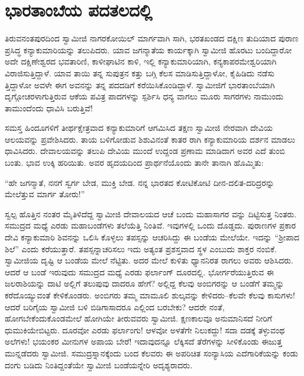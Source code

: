
\chapter{ಭಾರತಾಂಬೆಯ ಪದತಲದಲ್ಲಿ}

\noindent

ತಿರುವನಂತಪುರದಿಂದ ಸ್ವಾಮೀಜಿ ನಾಗರಕೋಯಿಲ್ ಮಾರ್ಗವಾಗಿ ಸಾಗಿ, ಭರತಖಂಡದ ದಕ್ಷಿಣ ತುದಿಯಾದ ಪುರಾಣ ಪ್ರಸಿದ್ಧ ಕನ್ಯಾಕುಮಾರಿಯನ್ನು ತಲುಪಿದರು. ಯಾವ ಜಗನ್ಮಾತೆಯ ಕಾರ್ಯಕ್ಕಾಗಿ ಸ್ವಾಮೀಜಿ ಹೊರಟು ಬಂದಿದ್ದಾರೋ ಅದೇ ದಕ್ಷಿಣೇಶ್ವರದ ಭವತಾರಿಣಿ, ಕಾಳೀಘಾಟಿನ ಕಾಳಿ, ಇಲ್ಲಿ ಕನ್ಯಾಕುಮಾರಿಯಾಗಿ, ಕನ್ಯಕಾಪರಮೇಶ್ವರಿಯಾಗಿ ವಿರಾಜಿಸುತ್ತಿದ್ದಾಳೆ. ಯಾವ ತಾಯಿ ತನ್ನ ಸುಪುತ್ರನ ಕತ್ತು ಬಗ್ಗಿ ಕೆಲಸ ಮಾಡಿಸುತ್ತಿದ್ದಾಳೋ, ಕೈಹಿಡಿದು ನಡೆಸು ತ್ತಿದ್ದಾಳೋ ಅವಳೇ ಈಗ ಅವನನ್ನು ತನ್ನ ಪದದಡಿಗೆ ಕರೆಯಿಸಿಕೊಂಡಿದ್ದಾಳೆ. ಸ್ವಾಮೀಜಿಗೆ ಭಾರತಾಂಬೆಯಾಗಿ ದೃಗ್ಗೋಚರಳಾಗುತ್ತಿರುವ ಆಕೆಯ ಪವಿತ್ರ ಪಾದಗಳನ್ನು ಸ್ಪರ್ಶಿಸಿ ಧನ್ಯ ವಾಗಲು ಮೂರು ಸಾಗರಗಳು ನಾಮುಂದು ತಾಮುಂದೆಂದು ಧಾವಿಸಿ ಬರುತ್ತಿವೆ!

ಸಮಸ್ತ ಹಿಂದೂಗಳಿಗೆ ತೀರ್ಥಕ್ಷೇತ್ರವಾದ ಕನ್ಯಾಕುಮಾರಿಗೆ ಆಗಮಿಸಿದ ತಕ್ಷಣ ಸ್ವಾಮೀಜಿ ನೇರವಾಗಿ ದೇವಿಯ ಆಲಯವನ್ನು ಪ್ರವೇಶಿಸಿದರು. ತಾಯ ಬಳಿಗೋಡುವ ಶಿಶುವಿನಂತೆ ಕಾತರ ರಾಗಿ ಕನ್ಯಾಕುಮಾರಿಯ ದರ್ಶನ ಮಾಡಲು ಧಾವಿಸಿದರು. ದೇವಾಲಯವನ್ನು ತಲುಪಿ ದೇವಿಯ ಮುಂದೆ ಉದ್ದಂಡ ಪ್ರಣಾಮ ಮಾಡಿದಾಗ ಅವರ ಎದೆ ತುಂಬಿ ಬಂತು. ಭಾವ ಉಕ್ಕಿ ಹರಿಯಿತು. ಅವರ ಹೃದಯದಿಂದ ಪ್ರಾರ್ಥನೆಯೊಂದು ತಾನೇ ತಾನಾಗಿ ಹೊಮ್ಮಿತು:

“ಹೇ ಜಗನ್ಮಾತೆ, ನನಗೆ ಸ್ವರ್ಗ ಬೇಡ, ಮುಕ್ತಿ ಬೇಡ. ನನ್ನ ಭಾರತದ ಕೋಟಿಕೋಟಿ ದೀನ-ದಲಿತ-ದರಿದ್ರರನ್ನು ಮೇಲೆತ್ತುವ ಮಾರ್ಗ ತೋರು!”

ಸ್ವಲ್ಪ ಹೊತ್ತಿನ ನಂತರ ಮೈತಿಳಿದೆದ್ದ ಸ್ವಾಮೀಜಿ ದೇವಾಲಯದ ಆಚೆ ಬಂದು ಮಹಾಸಾಗರ ವನ್ನು ದಿಟ್ಟಿಸುತ್ತ ನಿಂತರು. ಸಮುದ್ರದ ಮಧ್ಯೆ ಎರಡು ಮಹಾಬಂಡೆಗಳು ತಲೆಯೆತ್ತಿ ನಿಂತಿವೆ. ಇವುಗಳಲ್ಲಿ ಒಂದು ದೊಡ್ಡದು. ಪುರಾಣಗಳ ಪ್ರಕಾರ ದೇವಿ ಕನ್ಯಾಕುಮಾರಿ ಶಿವನನ್ನು ಒಲಿಸಿ ಕೊಳ್ಳಲು ತಪಸ್ಸನ್ನು ಆಚರಿಸಿದ್ದು ಈ ಬಂಡೆಯ ಮೇಲೆಯೇ. ಇದನ್ನು “ಶ್ರೀಪಾದ ಶಿಲೆ” ಎಂದು ಕರೆಯುತ್ತಾರೆ. ತಪಸ್ಸನ್ನಾಚರಿಸಲು ಇದು ಅತ್ಯಂತ ಪ್ರಶಸ್ತವಾದ ಸ್ಥಳ ಎಂಬುದು ಶಾಕ್ತರ ನಂಬಿಕೆ. ಸ್ವಾಮೀಜಿಯ ದೃಷ್ಟಿ ಆ ಬಂಡೆಯ ಮೇಲೆ ನೆಟ್ಟಿತು. ಅದರ ಮೇಲೆ ಕುಳಿತು ಧ್ಯಾನನಿರತ ರಾಗಲು ಅವರು ಆಶಿಸಿದರು. ಆದರೆ ಆ ಬಂಡೆ ಇರುವುದು ಸಮುದ್ರದ ಮಧ್ಯೆ ಎರಡು ಫರ್ಲಾಂಗ್ ದೂರದಲ್ಲಿ. ಭೋರ್ಗರೆಯುತ್ತಿರುವ ಈ ಜಲರಾಶಿಯನ್ನು ದಾಟಿ ಅಲ್ಲಿಗೆ ತಲುಪುವು ದಾದರೂ ಹೇಗೆ? ಅಲ್ಲಿದ್ದ ಕೆಲವು ಅಂಬಿಗರನ್ನು ಆ ಬಂಡೆಗೆ ತಮ್ಮನ್ನು ಕರೆದೊಯ್ಯುವಂತೆ ಕೇಳಿಕೊಂಡರು. ಅಂಬಿಗರು ತಮ್ಮ ಮಾಮೂಲಿ ಶುಲ್ಕವನ್ನು ಕೇಳಿದರು–ಕೆಲವೇ ಕೆಲವು ಕಾಸುಗಳು! ಆದರೆ ಬರಿಗೈಯ ಸ್ವಾಮೀಜಿ ಬಳಿ ಬಿಡಿಗಾಸಾದರೂ ಎಲ್ಲಿಂದ ಬರಬೇಕು? ಆದರೇ ನಂತೆ, ಹೋಗಬೇಕೆಂದುಕೊಂಡಮೇಲೆ ಹೋಗಿಯೇ ತೀರುವವರು ಸ್ವಾಮೀಜಿ. ಕ್ಷಣಕಾಲವೂ ಅನುಮಾನಿಸದೆ ನೀರಿಗೆ ಧುಮುಕಿಯೇಬಿಟ್ಟರು. ದೂರವೋ ಎರಡು ಫರ್ಲಾಂಗು! ಆಳವೋ ಅಳತೆಗೇ ನಿಲುಕದ್ದು! ಸದಾ ದಡಕ್ಕೆ ತಳ್ಳುವಂಥ ಅಲೆಗಳು! ಭಯಂಕರ ಮೀನುಗಳ ಅಪಾಯ ಬೇರೆ! ಇದಾವುದನ್ನೂ ಲೆಕ್ಕಿಸದೆ ತೆರೆಗಳನ್ನು ಸೀಳಿಕೊಂಡು ಈಜುತ್ತ ಮುನ್ನಡೆದರು ಸ್ವಾಮೀಜಿ. ಸಮುದ್ರಸ್ನಾನಕ್ಕೆಂದು ಬಂದ ಕೆಲವರು ಈ ಅಪರಿಚಿತ ಸಂನ್ಯಾಸಿಯ ಎದೆಗಾರಿಕೆಯನ್ನು ಕಂಡು ದಂಗು ಬಡಿದು ನಿಂತಿದ್ದಂತೆಯೇ ಸ್ವಾಮೀಜಿ ಬಂಡೆಯನ್ನೇರಿ ಅದೃಶ್ಯರಾದರು.

